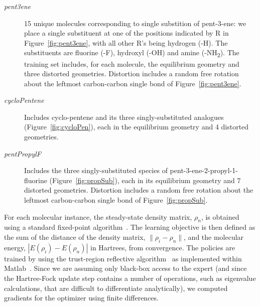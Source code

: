 \documentclass[twoside,11pt]{article}
\begin{document}
\begin{description}
\item[\textit{pent3ene}] 15 unique molecules corresponding to single substition of pent-3-ene: we place a single substituent at one of the positions indicated by R in Figure~\ref{fig:pent3ene}, with all other R's being hydrogen (-H). The substituents are fluorine (-F), hydroxyl (-OH) and amine (-NH\textsubscript{2}). The training set includes, for each molecule, the equilibrium geometry and three distorted geometries. Distortion includes a random free rotation about the leftmost carbon-carbon single bond of Figure~\ref{fig:pent3ene}. 
\item[\textit{cycloPentene}]Includes cyclo-pentene and its three singly-substituted analogues (Figure~\ref{fig:cycloPen}), each in the equilibrium geometry and 4 distorted geometries. 
\item[\textit{pentPropylF}] Includes the three singly-substituted species of pent-3-ene-2-propyl-1-fluorine (Figure~\ref{fig:propSub}), each in its equilibrium geometry and 7 distorted geometries. Distortion includes a random free rotation about the leftmost carbon-carbon single bond of Figure~\ref{fig:propSub}. 
\end{description}

For each molecular instance, the steady-state density matrix, $\rho_n$, is obtained using a standard fixed-point algorithm~\citep{Pulay1980}. The learning objective is then defined as the sum of the distance of the density matrix, $\|\rho_i-\rho_n\|$, and the molecular energy, $|E(\rho_i)-E(\rho_n)|$ in Hartrees, from convergence. The policies are trained by using the trust-region reflective algorithm~\citep{Coleman1996} as implemented within Matlab~\citep{Matlab}.  Since we are assuming only black-box access to the expert (and since the Hartree-Fock update step contains a number of operations, such as eigenvalue calculations, that are difficult to differentiate analytically), we computed gradients for the optimizer using finite differences.
\end{document}
